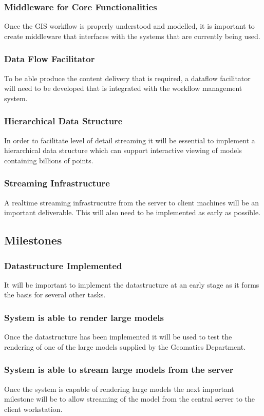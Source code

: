 \documentclass[12pt,a4paper]{article}
\begin{document}
\subsubsection*{Middleware for Core Functionalities}
Once the GIS workflow is properly understood and modelled, it is
important to create middleware that interfaces with the systems that are
currently being used.
\subsubsection*{Data Flow Facilitator}
To be able produce the content delivery that is required, a dataflow
facilitator will need to be developed that is integrated with the
workflow management system.
\subsubsection*{Hierarchical Data Structure}
In order to facilitate level of detail streaming it will be essential to
implement a hierarchical data structure which can support interactive
viewing of models containing billions of points.
\subsubsection*{Streaming Infrastructure}
A realtime streaming infrastrucutre from the server to client machines will be an important deliverable. This will also need to be implemented as early as possible.

\subsection{Milestones}
\subsubsection*{Datastructure Implemented}
It will be important to implement the datastructure at an early stage as it forms the basis for several other tasks.
\subsubsection*{System is able to render large models}
Once the datastructure has been implemented it will be used to test the rendering of one of the large models supplied by the Geomatics Department. 
\subsubsection*{System is able to stream large models from the server}
Once the system is capable of rendering large models the next important milestone will be to allow streaming of the model from the central server to the client workstation.
\end{document}
